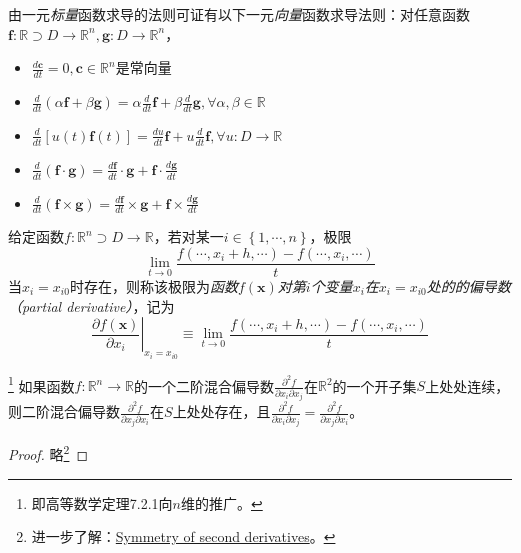 \documentclass[../main.tex]{subfiles}
\begin{document}
由一元\emph{标量}函数求导的法则可证有以下一元\emph{向量}函数求导法则：对任意函数$\mathbf{f}:\mathbb{R}\supset D\rightarrow\mathbb{R}^n,\mathbf{g}:D\rightarrow\mathbb{R}^n$，
\begin{itemize}
    \item $\frac{d\mathbf{c}}{dt}=0,\mathbf{c}\in\mathbb{R}^n$是常向量
    \item $\frac{d}{dt}\left(\alpha\mathbf{f}+\beta\mathbf{g}\right)=\alpha\frac{d}{dt}\mathbf{f}+\beta\frac{d}{dt}\mathbf{g},\forall \alpha,\beta\in\mathbb{R}$
    \item $\frac{d}{dt}\left[u\left(t\right)\mathbf{f}\left(t\right)\right]=\frac{du}{dt}\mathbf{f}+u\frac{d}{dt}\mathbf{f},\forall u:D\rightarrow\mathbb{R}$
    \item $\frac{d}{dt}\left(\mathbf{f}\cdot\mathbf{g}\right)=\frac{d\mathbf{f}}{dt}\cdot\mathbf{g}+\mathbf{f}\cdot\frac{d\mathbf{g}}{dt}$
    \item $\frac{d}{dt}\left(\mathbf{f}\times\mathbf{g}\right)=\frac{d\mathbf{f}}{dt}\times\mathbf{g}+\mathbf{f}\times\frac{d\mathbf{g}}{dt}$
\end{itemize}

\begin{definition}[多元标量值函数的偏导数]\label{def:II.4.10}
    给定函数$f:\mathbb{R}^n\supset D\rightarrow\mathbb{R}$，若对某一$i\in\left\{1,\cdots,n\right\}$，极限
    \[
        \lim_{t\to0}\frac{f\left(\cdots,x_{i}+h,\cdots\right)-f\left(\cdots,x_{i},\cdots\right)}{t}
    \]
    当$x_i=x_{i0}$时存在，则称该极限为\emph{函数$f\left(\mathbf{x}\right)$对第$i$个变量$x_i$在$x_i=x_{i0}$处的的偏导数（partial derivative）}，记为
    \[\left.\frac{\partial f\left(\mathbf{x}\right)}{\partial x_i}\right|_{x_i=x_{i0}}\equiv\lim_{t\to0}\frac{f\left(\cdots,x_{i}+h,\cdots\right)-f\left(\cdots,x_i,\cdots\right)}{t}
    \]
\end{definition}

\begin{theorem}\label{thm:II.4.6}\footnote{即高等数学\cite[p.~16]{华工高数2009下}定理7.2.1向$n$维的推广。}
    如果函数$f:\mathbb{R}^n\rightarrow\mathbb{R}$的一个二阶混合偏导数$\frac{\partial^2f}{\partial x_i\partial x_j}$在$\mathbb{R}^2$的一个开子集$S$上处处连续，则二阶混合偏导数$\frac{\partial^2f}{\partial x_j\partial x_i}$在$S$上处处存在，且$\frac{\partial^2f}{\partial x_i\partial x_j}=\frac{\partial^2f}{\partial x_j\partial x_i}$。
\end{theorem}
\begin{proof}
    略\footnote{进一步了解：\href{https://en.wikipedia.org/wiki/Symmetry_of_second_derivatives}{Symmetry of second derivatives}。}
\end{proof}
\end{document}
